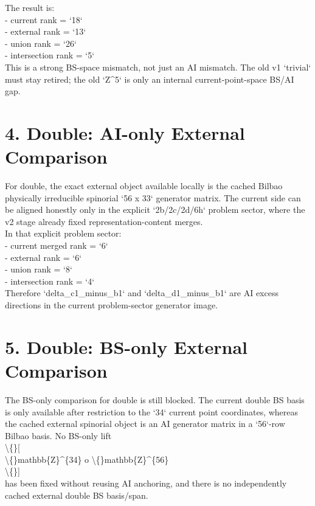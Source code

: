 \documentclass[11pt]{article}
\begin{document}
The result is:\\
- current rank = `18`\\
- external rank = `13`\\
- union rank = `26`\\
- intersection rank = `5`\\

This is a strong BS-space mismatch, not just an AI mismatch. The old v1 `trivial` must stay retired; the old `Z\textasciicircum{}5` is only an internal current-point-space BS/AI gap.\\

\section*{4. Double: AI-only External Comparison}

For double, the exact external object available locally is the cached Bilbao physically irreducible spinorial `56 x 33` generator matrix. The current side can be aligned honestly only in the explicit `2b/2c/2d/6h` problem sector, where the v2 stage already fixed representation-content merges.\\

In that explicit problem sector:\\
- current merged rank = `6`\\
- external rank = `6`\\
- union rank = `8`\\
- intersection rank = `4`\\

Therefore `delta\_c1\_minus\_b1` and `delta\_d1\_minus\_b1` are AI excess directions in the current problem-sector generator image.\\

\section*{5. Double: BS-only External Comparison}

The BS-only comparison for double is still blocked. The current double BS basis is only available after restriction to the `34` current point coordinates, whereas the cached external spinorial object is an AI generator matrix in a `56`-row Bilbao basis. No BS-only lift\\
\textbackslash\{\}[\\
\textbackslash\{\}mathbb\{Z\}\textasciicircum{}\{34\} 	o \textbackslash\{\}mathbb\{Z\}\textasciicircum{}\{56\}\\
\textbackslash\{\}]\\
has been fixed without reusing AI anchoring, and there is no independently cached external double BS basis/span.\\
\end{document}
